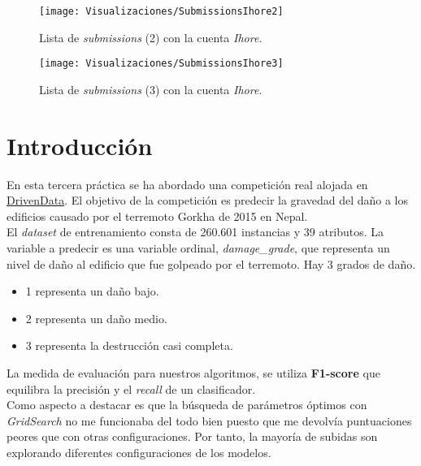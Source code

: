\documentclass[paper=a4, fontsize=12pt]{article} %
\numberwithin{equation}{section} %
\numberwithin{figure}{section} %
\numberwithin{table}{section} %
\begin{document}
\begin{figure}[H]
  \centering
  \texttt{[image: Visualizaciones/SubmissionsIhore2]}
  \caption{Lista de \textit{submissions} (2) con la cuenta \textit{Ihore}.}
  \label{subI2}
\end{figure}

\begin{figure}[H]
  \centering
  \texttt{[image: Visualizaciones/SubmissionsIhore3]}
  \caption{Lista de \textit{submissions} (3) con la cuenta \textit{Ihore}.}
  \label{subI3}
\end{figure}

\newpage

\tableofcontents %
\newpage
{}

\section{Introducción}
\large En esta tercera práctica se ha abordado una competición real alojada en \href{https://www.drivendata.org/competitions/57/nepal-earthquake/}{DrivenData}. El objetivo de la competición es predecir la gravedad del daño a los edificios causado por el terremoto Gorkha de 2015 en Nepal. \\ 

El \textit{dataset} de entrenamiento consta de 260.601 instancias y 39 atributos. La variable a predecir es una variable ordinal, \textit{damage\_grade}, que representa un nivel de daño al edificio que fue golpeado por el terremoto. Hay 3 grados de daño.

\begin {itemize}
\item 1 representa un daño bajo.
\item 2 representa un daño medio.
\item 3 representa la destrucción casi completa.
\end{itemize}

La medida de evaluación para nuestros algoritmos, se utiliza \textbf{F1-score} que equilibra la precisión y el \textit{recall} de un clasificador. \\

Como aspecto a destacar es que la búsqueda de parámetros óptimos con \textit{GridSearch} no me funcionaba del todo bien puesto que me devolvía puntuaciones peores que con otras configuraciones. Por tanto, la mayoría de subidas son explorando diferentes configuraciones de los modelos.
\end{document}
